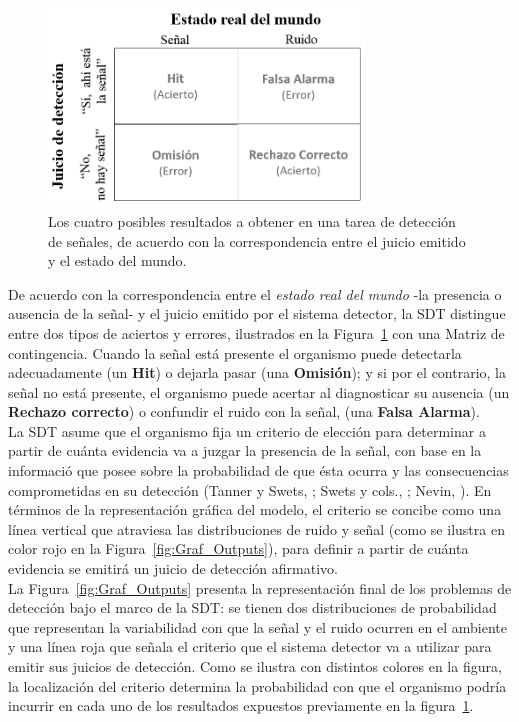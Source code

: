 \begin{figure}[h]
\centering
\includegraphics[width=0.75\textwidth]{Figures/Matriz_Outputs} 
\caption[Matriz de contingencia: Resultados a obtener en una tarea de detección]{Los cuatro posibles resultados a obtener en una tarea de detección de señales, de acuerdo con la correspondencia entre el juicio emitido y el estado del mundo.}
\label{fig:Mat_Output}
\end{figure}

De acuerdo con la correspondencia entre el \textit{estado real del mundo} -la presencia o ausencia de la señal- y el juicio emitido por el sistema detector, la SDT distingue entre dos tipos de aciertos y errores, ilustrados en la Figura~\ref{fig:Mat_Output} con una Matriz de contingencia. Cuando la señal está presente el organismo puede detectarla adecuadamente (un \textbf{Hit}) o dejarla pasar (una \textbf{Omisión}); y si por el contrario, la señal no está presente, el organismo puede acertar al diagnosticar su ausencia (un \textbf{Rechazo correcto}) o confundir el ruido con la señal, (una \textbf{Falsa Alarma}).\\

La SDT asume que el organismo fija un criterio de elección para determinar a partir de cuánta evidencia va a juzgar la presencia de la señal, con base en la informació que posee sobre la probabilidad de que ésta ocurra y las consecuencias comprometidas en su detección (Tanner y Swets, \citeyear{Tanner1954}; Swets y cols., \citeyear{Swets1961}; Nevin, \citeyear{Nevin1969}). En términos de la representación gráfica del modelo, el criterio se concibe como una línea vertical que atraviesa las distribuciones de ruido y señal (como se ilustra en color rojo en la Figura~\ref{fig:Graf_Outputs}), para definir a partir de cuánta evidencia se emitirá un juicio de detección afirmativo.\\

La Figura~\ref{fig:Graf_Outputs} presenta la representación final de los problemas de detección bajo el marco de la SDT: se tienen dos distribuciones de probabilidad que representan la variabilidad con que la señal y el ruido ocurren en el ambiente y una línea roja que señala el criterio que el sistema detector va a utilizar para emitir sus juicios de detección. Como se ilustra con distintos colores en la figura, la localización del criterio determina la probabilidad con que el organismo podría incurrir en cada uno de los resultados expuestos previamente en la figura~\ref{fig:Mat_Output}.\\

